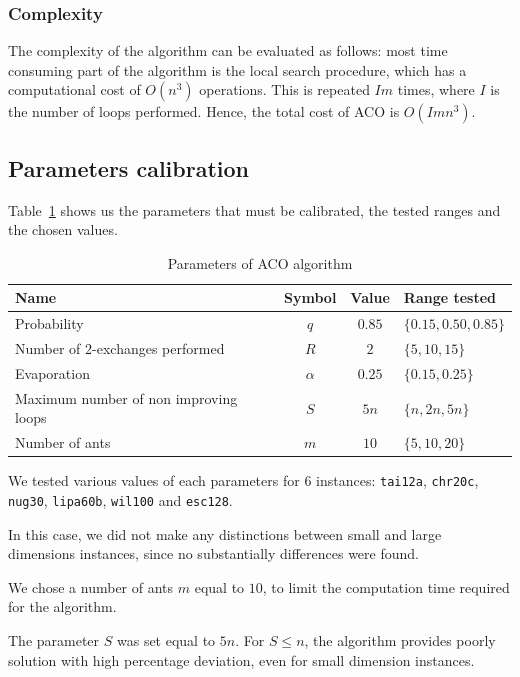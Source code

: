 \subsubsection{Complexity}
The complexity of the algorithm can be evaluated as follows: most time consuming part of the algorithm is the local search procedure, which has a computational cost of $O(n^3)$ operations. This is repeated $Im$ times, where $I$ is the number of loops performed. Hence, the total cost of ACO is $O\left(Imn^3\right)$.

\subsection{Parameters calibration}
Table~\ref{tab:ACOParam} shows us the parameters that must be calibrated, the tested ranges and the chosen values.

\begin{table}[htp]
	\small
	\centering
	\caption{Parameters of ACO algorithm}
	\label{tab:ACOParam}
	\begin{tabular}{lccl}
		\toprule
		Name & Symbol & Value & Range tested \\
		\midrule
		Probability & $q$ & $0.85$ &$\{0.15, 0.50, 0.85\}$ \\
		Number of $2$-exchanges performed & $R$& $2$ &$\{5,10,15\}$\\
		Evaporation & $\alpha$ & $0.25$ & $\{0.15, 0.25\}$\\
		Maximum number of non improving loops & $S$&  $5n$ & $\{n, 2n, 5n\}$\\
		Number of ants & $m$ & $10$  & $\{5,10,20\} $\\
		
		
		\bottomrule
	\end{tabular}
\end{table}


We tested various values of each parameters for $6$ instances: \texttt{tai12a}, \texttt{chr20c}, \texttt{nug30}, \texttt{lipa60b}, \texttt{wil100} and \texttt{esc128}.

In this case, we did not make any distinctions between small and large dimensions instances, since no substantially differences were found.




We chose a number of ants $m$ equal to $10$, to limit the computation time required for the algorithm. 

The parameter $S$ was set equal to $5n$. For $S \le n$, the algorithm provides poorly solution with high percentage deviation, even for small dimension instances.

